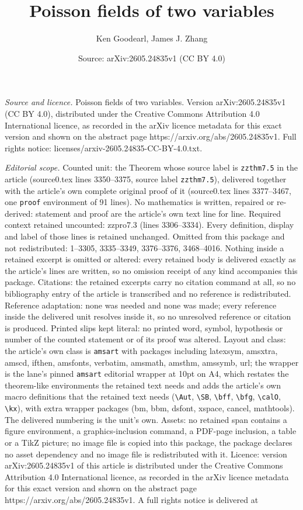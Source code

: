 \documentclass[10pt,a4paper]{amsart}
\title[Poisson fields of two variables]{Poisson fields of two variables}
\author{Ken Goodearl, James J. Zhang}
\date{Source: arXiv:2605.24835v1 (CC BY 4.0)}
\begin{document}
\maketitle

\noindent\emph{Source and licence.} Poisson fields of two variables. Version arXiv:2605.24835v1 (CC BY 4.0), distributed under the Creative Commons Attribution 4.0 International licence, as recorded in the arXiv licence metadata for this exact version and shown on the abstract page https://arxiv.org/abs/2605.24835v1. Full rights notice: licenses/arxiv-2605.24835-CC-BY-4.0.txt.\par\smallskip

\noindent\textit{Editorial scope.} Counted unit: the Theorem whose source label is \texttt{zzthm7.5} in the article (source0.tex lines 3350--3375, source label \texttt{zzthm7.5}), delivered together with the article's own complete original proof of it (source0.tex lines 3377--3467, one \texttt{proof} environment of 91 lines). No mathematics is written, repaired or re-derived: statement and proof are the article's own text line for line. Required context retained uncounted: zzpro7.3 (lines 3306--3334). Every definition, display and label of those lines is retained unchanged. Omitted from this package and not redistributed: 1--3305, 3335--3349, 3376--3376, 3468--4016. Nothing inside a retained excerpt is omitted or altered: every retained body is delivered exactly as the article's lines are written, so no omission receipt of any kind accompanies this package. Citations: the retained excerpts carry no citation command at all, so no bibliography entry of the article is transcribed and no reference is redistributed. Reference adaptation: none was needed and none was made; every reference inside the delivered unit resolves inside it, so no unresolved reference or citation is produced. Printed slips kept literal: no printed word, symbol, hypothesis or number of the counted statement or of its proof was altered. Layout and class: the article's own class is \texttt{amsart} with packages including latexsym, amsxtra, amscd, ifthen, amsfonts, verbatim, amsmath, amsthm, amssymb, url; the wrapper is the lane's pinned \texttt{amsart} editorial wrapper at 10pt on A4, which restates the theorem-like environments the retained text needs and adds the article's own macro definitions that the retained text needs (\texttt{\textbackslash Aut}, \texttt{\textbackslash SB}, \texttt{\textbackslash bff}, \texttt{\textbackslash bfg}, \texttt{\textbackslash calO}, \texttt{\textbackslash kx}), with extra wrapper packages (bm, bbm, dsfont, xspace, cancel, mathtools). The delivered numbering is the unit's own. Assets: no retained span contains a figure environment, a graphics-inclusion command, a PDF-page inclusion, a table or a TikZ picture; no image file is copied into this package, the package declares no asset dependency and no image file is redistributed with it. Licence: version arXiv:2605.24835v1 of this article is distributed under the Creative Commons Attribution 4.0 International licence, as recorded in the arXiv licence metadata for this exact version and shown on the abstract page https://arxiv.org/abs/2605.24835v1. A full rights notice is delivered at 
\end{document}
